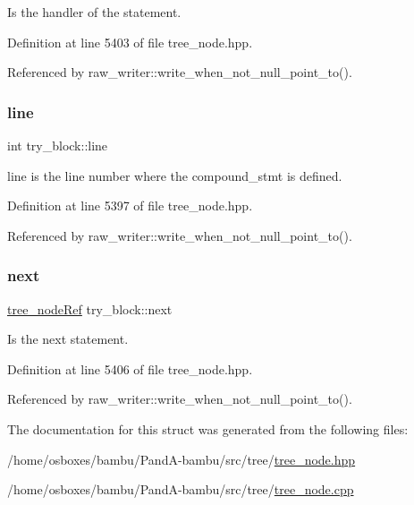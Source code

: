 Is the handler of the statement. 



Definition at line 5403 of file tree\+\_\+node.\+hpp.



Referenced by raw\+\_\+writer\+::write\+\_\+when\+\_\+not\+\_\+null\+\_\+point\+\_\+to().

\mbox{\label{structtry__block_a49a4ee358822e743a7a74884fca99983}} 
\subsubsection{\texorpdfstring{line}{line}}
{\footnotesize\ttfamily int try\+\_\+block\+::line}



line is the line number where the compound\+\_\+stmt is defined. 



Definition at line 5397 of file tree\+\_\+node.\+hpp.



Referenced by raw\+\_\+writer\+::write\+\_\+when\+\_\+not\+\_\+null\+\_\+point\+\_\+to().

\mbox{\label{structtry__block_aa9981dec15bc1cb7a1dcea4de0fceda6}} 
\subsubsection{\texorpdfstring{next}{next}}
{\footnotesize\ttfamily \hyperlink{tree__node_8hpp_a6ee377554d1c4871ad66a337eaa67fd5}{tree\+\_\+node\+Ref} try\+\_\+block\+::next}



Is the next statement. 



Definition at line 5406 of file tree\+\_\+node.\+hpp.



Referenced by raw\+\_\+writer\+::write\+\_\+when\+\_\+not\+\_\+null\+\_\+point\+\_\+to().



The documentation for this struct was generated from the following files\+:\begin{DoxyCompactItemize}
\item 
/home/osboxes/bambu/\+Pand\+A-\/bambu/src/tree/\hyperlink{tree__node_8hpp}{tree\+\_\+node.\+hpp}\item 
/home/osboxes/bambu/\+Pand\+A-\/bambu/src/tree/\hyperlink{tree__node_8cpp}{tree\+\_\+node.\+cpp}\end{DoxyCompactItemize}
